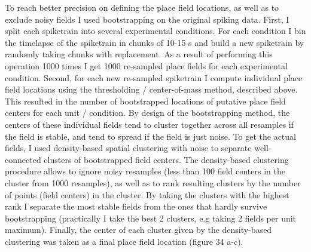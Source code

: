 To reach better precision on defining the place field locations, as well as to exclude noisy fields I used bootstrapping on the original spiking data. First, I split each spiketrain into several experimental conditions. For each condition I bin the timelapse of the spiketrain in chunks of 10-15 s and build a new spiketrain by randomly taking chunks with replacement. As a result of performing this operation 1000 times I get 1000 re-sampled place fields for each experimental condition. Second, for each new re-sampled spiketrain I compute individual place field locations using the thresholding / center-of-mass method, described above. This resulted in the number of bootstrapped locations of putative place field centers for each unit / condition. By design of the bootstrapping method, the centers of these individual fields tend to cluster together across all resamples if the field is stable, and tend to spread if the field is just noise. To get the actual fields, I used density-based spatial clustering with noise to separate well-connected clusters of bootstrapped field centers. The density-based clustering procedure allows to ignore noisy resamples (less than 100 field centers in the cluster from 1000 resamples), as well as to rank resulting clusters by the number of points (field centers) in the cluster. By taking the clusters with the highest rank I separate the most stable fields from the ones that hardly survive bootstrapping (practically I take the best 2 clusters, e.g taking 2 fields per unit maximum). Finally, the center of each cluster given by the density-based clustering was taken as a final place field location (figure 34 a-c).

